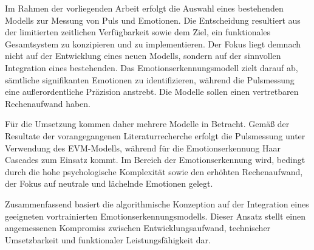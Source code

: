 Im Rahmen der vorliegenden Arbeit erfolgt die Auswahl eines bestehenden Modells zur Messung von Puls und Emotionen. Die Entscheidung resultiert aus der limitierten zeitlichen Verfügbarkeit sowie dem Ziel, ein funktionales Gesamtsystem zu konzipieren und zu implementieren. Der Fokus liegt demnach nicht auf der Entwicklung eines neuen Modells, sondern auf der sinnvollen Integration eines bestehenden. Das Emotionserkennungsmodell zielt darauf ab, sämtliche signifikanten Emotionen zu identifizieren, während die Pulsmessung eine außerordentliche Präzision anstrebt. Die Modelle sollen einen vertretbaren Rechenaufwand haben.

Für die Umsetzung kommen daher mehrere Modelle in Betracht. Gemäß der Resultate der vorangegangenen Literaturrecherche erfolgt die Pulsmessung unter Verwendung des EVM-Modells, während für die Emotionserkennung Haar Cascades zum Einsatz kommt.
Im Bereich der Emotionserkennung wird, bedingt durch die hohe psychologische Komplexität sowie den erhöhten Rechenaufwand, der Fokus auf neutrale und lächelnde Emotionen gelegt.

Zusammenfassend basiert die algorithmische Konzeption auf der Integration eines geeigneten vortrainierten Emotionserkennungsmodells. Dieser Ansatz stellt einen angemessenen Kompromiss zwischen Entwicklungsaufwand, technischer Umsetzbarkeit und funktionaler Leistungsfähigkeit dar.
